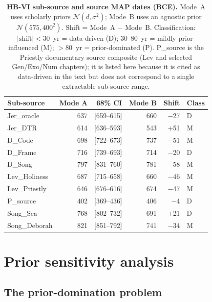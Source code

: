 \documentclass[10pt,letterpaper]{article}
\begin{document}
\begin{table}[!ht]
\centering
\caption{\textbf{HB-VI sub-source and source MAP dates (BCE).}  Mode~A uses
scholarly priors $\mathcal{N}(d,\sigma^2)$; Mode~B uses an agnostic
prior $\mathcal{N}(575, 400^2)$.  Shift = Mode~A $-$ Mode~B.
Classification: $|\text{shift}|{<}30$~yr = data-driven (D);
30--80~yr = mildly prior-influenced (M); ${>}80$~yr = prior-dominated (P).
P\_source is the Priestly documentary source composite (Lev and selected
Gen/Exo/Num chapters); it is listed here because it is cited as
data-driven in the text but does not correspond to a single
extractable sub-source range.}
\begin{tabular}{lrrrrl}
\hline
\textbf{Sub-source} & \textbf{Mode A} & \textbf{68\% CI} &
  \textbf{Mode B} & \textbf{Shift} & \textbf{Class} \\
\hline
Jer\_oracle     & 637 & [659--615] & 660 & $-$27 & D \\
Jer\_DTR        & 614 & [636--593] & 543 & $+$51 & M \\
D\_Code         & 698 & [722--673] & 737 & $-$51 & M \\
D\_Frame        & 716 & [739--693] & 714 & $-$20 & D \\
D\_Song         & 797 & [831--760] & 781 & $-$58 & M \\
Lev\_Holiness   & 687 & [715--658] & 660 & $-$46 & M \\
Lev\_Priestly   & 646 & [676--616] & 674 & $-$47 & M \\
P\_source       & 402 & [369--436] & 406 & $-$4  & D \\
Song\_Sea       & 768 & [802--732] & 691 & $+$21 & D \\
Song\_Deborah   & 821 & [851--792] & 741 & $-$34 & M \\
\hline
\end{tabular}
\label{tab:subsources}
\end{table}

\section*{Prior sensitivity analysis}

\subsection*{The prior-domination problem}
\end{document}
